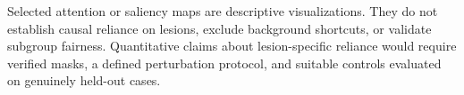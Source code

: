 Selected attention or saliency maps are descriptive visualizations. They do
not establish causal reliance on lesions, exclude background shortcuts, or
validate subgroup fairness. Quantitative claims about lesion-specific reliance
would require verified masks, a defined perturbation protocol, and suitable
controls evaluated on genuinely held-out cases.
